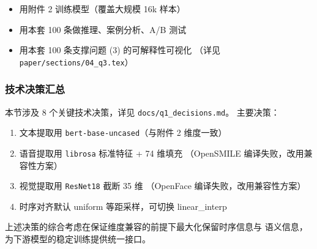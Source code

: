 \begin{itemize}
    \item 用附件 2 训练模型（覆盖大规模 16k 样本）
    \item 用本套 100 条做推理、案例分析、A/B 测试
    \item 用本套 100 条支撑问题 (3) 的可解释性可视化
          （详见 \texttt{paper/sections/04\_q3.tex}）
\end{itemize}

\subsubsection{技术决策汇总}

本节涉及 8 个关键技术决策，详见 \texttt{docs/q1\_decisions.md}。
主要决策：

\begin{enumerate}
    \item 文本提取用 \texttt{bert-base-uncased}（与附件 2 维度一致）
    \item 语音提取用 \texttt{librosa} 标准特征 + 74 维填充
          （OpenSMILE 编译失败，改用兼容性方案）
    \item 视觉提取用 \texttt{ResNet18} 截断 35 维
          （OpenFace 编译失败，改用兼容性方案）
    \item 时序对齐默认 uniform 等距采样，可切换 linear\_interp
\end{enumerate}

上述决策的综合考虑在保证维度兼容的前提下最大化保留时序信息与
语义信息，为下游模型的稳定训练提供统一接口。

